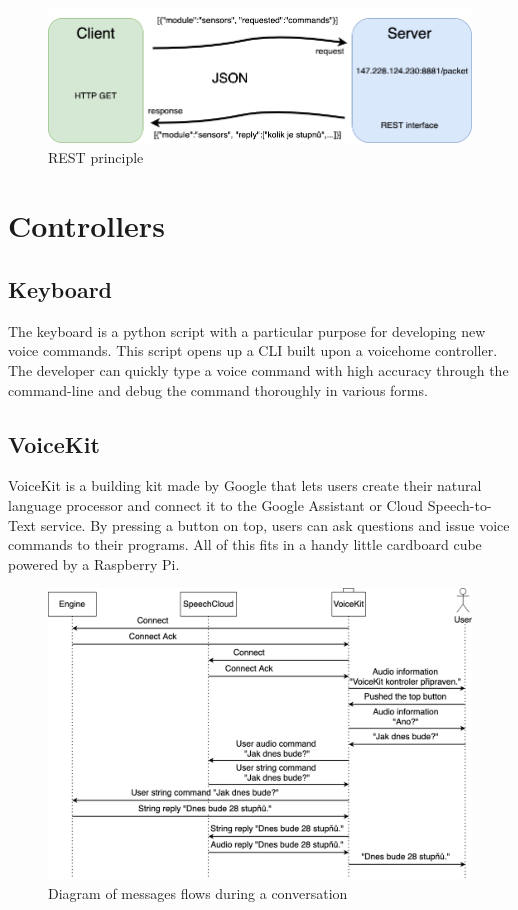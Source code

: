 \begin{figure}[H]
  \centering
  \includegraphics[width=\textwidth]{img/REST_schema.png}
  \caption{REST principle}
  \label{fig:REST_schema}
\end{figure}

\section{Controllers}

\subsection{Keyboard}

The keyboard is a python script with a particular purpose for developing new voice commands. This script opens up a CLI built upon a voicehome controller. The developer can quickly type a voice command with high accuracy through the command-line and debug the command thoroughly in various forms.

\subsection{VoiceKit}

VoiceKit is a building kit made by Google that lets users create their natural language processor and connect it to the Google Assistant or Cloud Speech-to-Text service. By pressing a button on top, users can ask questions and issue voice commands to their programs. All of this fits in a handy little cardboard cube powered by a Raspberry Pi.\citep{aiy_projects}

\begin{figure}[H]
	\centering
	\includegraphics[width=\textwidth]{img/message_flow.png}
	\caption{Diagram of messages flows during a conversation}
	\label{fig:message_flow}
\end{figure}

